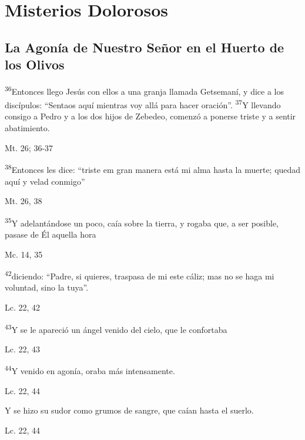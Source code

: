 \documentclass[a4paper,11pt,sans]{article}
\begin{document}
    \newpage
        
  \section*{\hfil Misterios Dolorosos \hfil}
    \subsection*{\hfil La Agonía de Nuestro Señor en el Huerto de los Olivos \hfil}
      
      \textsuperscript{36}Entonces llego Jesús con ellos a una granja llamada Getsemaní, y dice a los discípulos: ``Sentaos aquí mientras voy allá para hacer oración''. 
      \textsuperscript{37}Y llevando consigo a Pedro y a los dos hijos de Zebedeo, comenzó a ponerse triste y a sentir abatimiento.
      \begin{center}
        Mt. 26; 36-37     
      \end{center}

      \textsuperscript{38}Entonces les dice: ``triste em gran manera está mi alma hasta la muerte; quedad aquí y velad conmigo''
      \begin{center}
        Mt. 26, 38
      \end{center}

      \textsuperscript{35}Y adelantándose un poco, caía sobre la tierra, y rogaba que, a ser posible, pasase de Él aquella hora
      \begin{center}
        Mc. 14, 35  
      \end{center}

      \textsuperscript{42}diciendo: ``Padre, si quieres, traspasa de mi este cáliz; mas no se haga mi voluntad, sino la tuya''.
      \begin{center}
        Lc. 22, 42
      \end{center}

      \textsuperscript{43}Y se le apareció un ángel venido del cielo, que le confortaba
      \begin{center}
        Lc. 22, 43
      \end{center}

      \textsuperscript{44}Y venido en agonía, oraba más intensamente. 
      \begin{center}
        Lc. 22, 44
      \end{center}

      Y se hizo su sudor como grumos de sangre, que caían hasta el suerlo.
      \begin{center}
        Lc. 22, 44
      \end{center}
\end{document}
